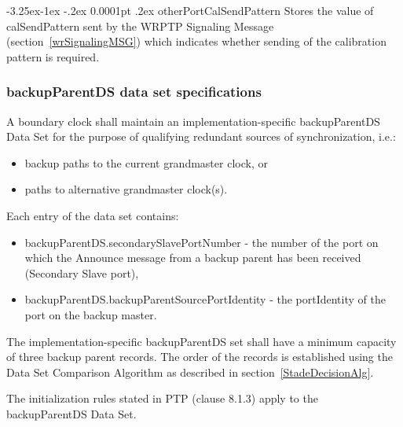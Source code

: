 \documentclass[a4paper, 12pt]{article}
\makeatletter
\renewcommand\paragraph{\@startsection{paragraph}{4}{\z@}%
                                     {-3.25ex\@plus -1ex \@minus -.2ex}%
                                     {0.0001pt \@plus .2ex}%
                                     {\normalfont\normalsize\bfseries}}
\renewcommand\subparagraph{\@startsection{subparagraph}{5}{\z@}%
                                     {-3.25ex\@plus -1ex \@minus -.2ex}%
                                     {0.0001pt \@plus .2ex}%
                                     {\normalfont\normalsize\bfseries}}
\makeatother
\begin{document}
\subparagraph{otherPortCalSendPattern} 
\label{par:otherPortCalSendPattern}
Stores the value of calSendPattern sent by the WRPTP Signaling Message 
(section~\ref{wrSignalingMSG}) which indicates whether sending of the calibration pattern is 
required.




\subsubsection{backupParentDS data set specifications}

A boundary clock shall maintain an implementation-specific backupParentDS Data Set for the purpose 
of qualifying redundant sources of synchronization, i.e.:
\begin{itemize}
  \item backup paths to the current grandmaster clock, or
  \item paths to alternative grandmaster clock(s).
\end{itemize}
Each entry of the data set contains:

\begin{itemize}
  \item backupParentDS.secondarySlavePortNumber - the number of the port on which the Announce 
	message from a backup parent has been received (Secondary Slave port),
  \item backupParentDS.backupParentSourcePortIdentity - the portIdentity of the port on the backup 
        master.
\end{itemize}

The implementation-specific backupParentDS set shall have a minimum capacity of three backup parent 
records. The order of the records is established using the Data Set Comparison Algorithm as described
in section~\ref{StadeDecisionAlg}.

The initialization rules stated in PTP (clause 8.1.3) apply to the backupParentDS Data Set.
\end{document}
